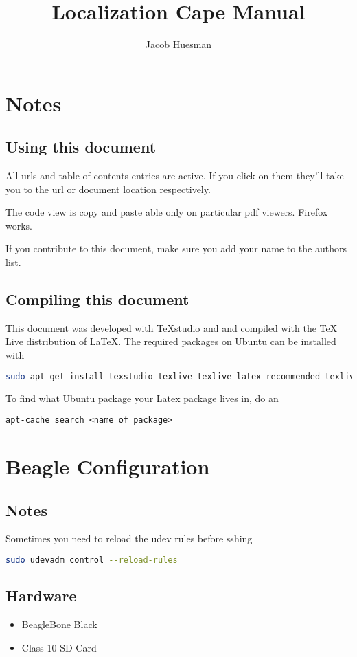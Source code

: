 \documentclass[]{book}
\title{Localization Cape Manual}
\author{Jacob Huesman}
\begin{document}
\let\cleardoublepage\clearpage
\maketitle
\tableofcontents


\chapter{Notes}
\section{Using this document}
All urls and table of contents entries are active. If you click on them they'll take you to the url or document location respectively.

The code view is copy and paste able only on particular pdf viewers. Firefox works.

If you contribute to this document, make sure you add your name to the authors list.

\section{Compiling this document}
This document was developed with TeXstudio and and compiled with the TeX Live distribution of LaTeX. The required packages on Ubuntu can be installed with
\begin{lstlisting}[language=bash]
sudo apt-get install texstudio texlive texlive-latex-recommended texlive-latex-extra texlive-fonts-extra
\end{lstlisting}
To find what Ubuntu package your Latex package lives in, do an
\begin{lstlisting}
apt-cache search <name of package>
\end{lstlisting}


\chapter{Beagle Configuration}
\section{Notes}
Sometimes you need to reload the udev rules before sshing
\begin{lstlisting}[language=bash]
sudo udevadm control --reload-rules
\end{lstlisting}


\section{Hardware}
\begin{itemize}%
	\item BeagleBone Black
	\item Class 10 SD Card
\end{itemize}
\end{document}
